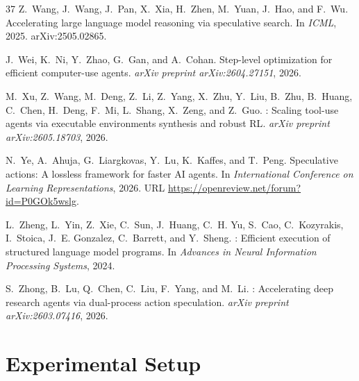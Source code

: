 \documentclass[11pt, copyright, logo, secondlogo]{template/lark}
\begin{document}
\begin{thebibliography}{37}
Z.~Wang, J.~Wang, J.~Pan, X.~Xia, H.~Zhen, M.~Yuan, J.~Hao, and F.~Wu.
\newblock Accelerating large language model reasoning via speculative search.
\newblock In \emph{ICML}, 2025{}.
\newblock arXiv:2505.02865.

J.~Wei, K.~Ni, Y.~Zhao, G.~Gan, and A.~Cohan.
\newblock Step-level optimization for efficient computer-use agents.
\newblock \emph{arXiv preprint arXiv:2604.27151}, 2026.

M.~Xu, Z.~Wang, M.~Deng, Z.~Li, Z.~Yang, X.~Zhu, Y.~Liu, B.~Zhu, B.~Huang,
  C.~Chen, H.~Deng, F.~Mi, L.~Shang, X.~Zeng, and Z.~Guo.
: Scaling tool-use agents via executable environments
  synthesis and robust {RL}.
\newblock \emph{arXiv preprint arXiv:2605.18703}, 2026.

N.~Ye, A.~Ahuja, G.~Liargkovas, Y.~Lu, K.~Kaffes, and T.~Peng.
\newblock Speculative actions: A lossless framework for faster {AI} agents.
\newblock In \emph{International Conference on Learning Representations}, 2026.
\newblock URL \url{https://openreview.net/forum?id=P0GOk5wslg}.

L.~Zheng, L.~Yin, Z.~Xie, C.~Sun, J.~Huang, C.~H. Yu, S.~Cao, C.~Kozyrakis,
  I.~Stoica, J.~E. Gonzalez, C.~Barrett, and Y.~Sheng.
: Efficient execution of structured language model programs.
\newblock In \emph{Advances in Neural Information Processing Systems}, 2024.

S.~Zhong, B.~Lu, Q.~Chen, C.~Liu, F.~Yang, and M.~Li.
: Accelerating deep research agents via dual-process action
  speculation.
\newblock \emph{arXiv preprint arXiv:2603.07416}, 2026.

\end{thebibliography}



\clearpage
\appendix
%
\section{Experimental Setup}
\label{sec:appendix_setup}
\end{document}
